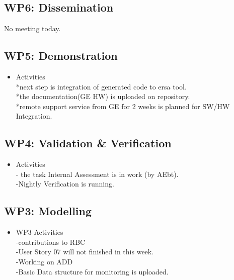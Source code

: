 \documentclass[a4paper, 11pt]{article}
\begin{document}
\subsection{WP6: Dissemination}

 No meeting today.
 
\subsection{WP5: Demonstration}

\begin{itemize}
\item Activities\\




*next step is integration of generated code to ersa tool.  \\
*the documentation(GE HW) is uploaded on repository.  \\
*remote support service from GE for 2 weeks is planned for SW/HW Integration.\\
\end{itemize}

\subsection{WP4: Validation \& Verification}
\begin{itemize}
\item Activities\\

  
- the task Internal Assessment is in work (by AEbt).\\
-Nightly Verification is running.\\

\end{itemize}

\subsection{WP3: Modelling}

\begin{itemize}
\item WP3 Activities\\
-contributions to RBC\\
-User Story 07 will not finished in this week.\\
-Working on ADD\\
-Basic Data structure for monitoring is uploaded.\\
\end{itemize}
\end{document}
